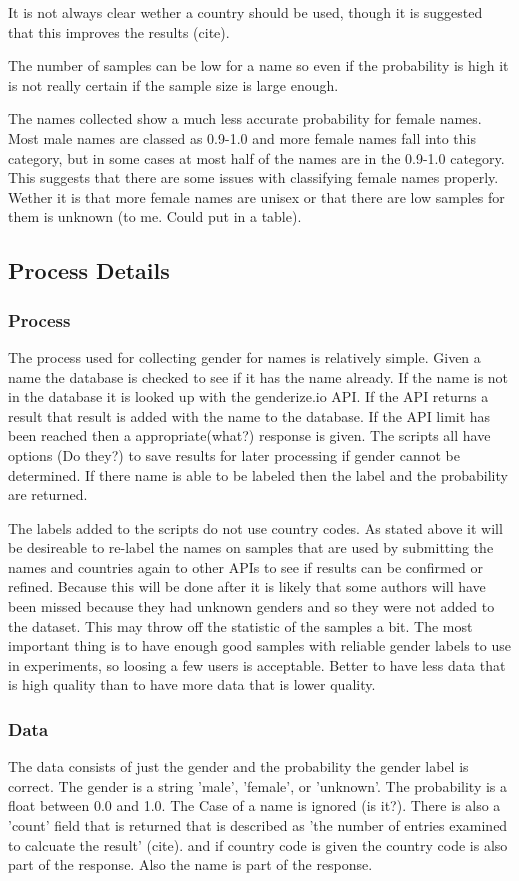 \documentclass{article}
\begin{document}
It is not always clear wether a country should be used, though it is suggested that this improves the results (cite).

The number of samples can be low for a name so even if the probability is high it is not really certain if the sample size is large enough.

The names collected show a much less accurate probability for female names. Most male names are classed as 0.9-1.0 and more female names fall into this category, but in some cases at most half of the names are in the 0.9-1.0 category. This suggests that there are some issues with classifying female names properly. Wether it is that more female names are unisex or that there are low samples for them is unknown (to me. Could put in a table).


\subsection{Process Details}
\subsubsection{Process}
The process used for collecting gender for names is relatively simple. Given a name the database is checked to see if it has the name already. If the name is not in the database it is looked up with the genderize.io API. If the API returns a result that result is added with the name to the database. If the API limit has been reached then a appropriate(what?) response is given. The scripts all have options (Do they?) to save results for later processing if gender cannot be determined. If there name is able to be labeled then the label and the probability are returned.

The labels added to the scripts do not use country codes. As stated above it will be desireable to re-label the names on samples that are used by submitting the names and countries again to other APIs to see if results can be confirmed or refined. Because this will be done after it is likely that some authors will have been missed because they had unknown genders and so they were not added to the dataset. This may throw off the statistic of the samples a bit. The most important thing is to have enough good samples with reliable gender labels to use in experiments, so loosing a few users is acceptable. Better to have less data that is high quality than to have more data that is lower quality.

\subsubsection{Data}
The data consists of just the gender and the probability the gender label is correct. The gender is a string 'male', 'female', or 'unknown'. The probability is a float between 0.0 and 1.0. The Case of a name is ignored (is it?). There is also a 'count' field that is returned that is described as 'the number of entries examined to calcuate the result' (cite). and if country code is given the country code is also part of the response. Also the name is part of the response.
\end{document}
